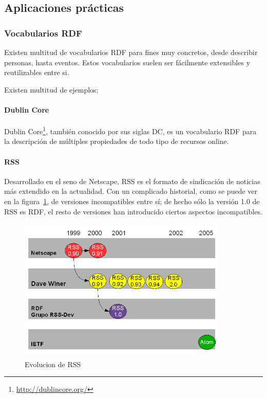 \subsection{Aplicaciones prácticas}

\subsubsection{Vocabularios RDF}

Existen multitud de vocabularios RDF para fines muy concretos, desde describir
personas, hasta eventos. Estos vocabularios suelen ser fácilmente extensibles y 
reutilizables entre si.

Existen multitud de ejemplos:

\paragraph{Dublin Core\label{sec:dc}}

Dublin Core\footnote{\url{http://dublincore.org/}}, también conocido por sus siglas DC,
es un vocabulario RDF para la descripción de múltiples propiedades de todo tipo de 
recursos online.

\paragraph{RSS}

Desarrollado en el seno de Netscape, RSS es el formato de sindicación de noticias
más extendido en la actualidad. Con un complicado historial, como se puede ver en la
figura~\ref{fig:rssEvolution}, de versiones incompatibles entre sí; de hecho sólo 
la versión 1.0 de RSS es RDF, el resto de versiones han introducido ciertos aspectos
incompatibles.

\begin{figure}[H]
	\centering
	\includegraphics[width=10cm]{images/rssEvolution.png}
	\caption{Evolucion de RSS}
	\label{fig:rssEvolution}
\end{figure}

